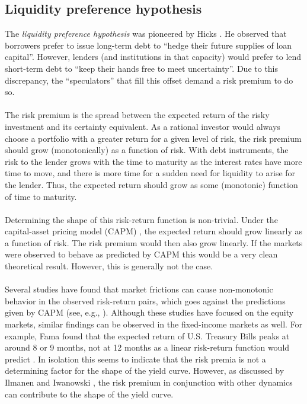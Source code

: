 \documentclass[a4paper]{artikel3}
\numberwithin{equation}{section}
\numberwithin{theorem}{section}
\numberwithin{proposition}{section}
\numberwithin{lemma}{section}
\begin{document}
\subsection{Liquidity preference hypothesis}
\label{sec:liquidity}


The \emph{liquidity preference hypothesis} was pioneered by Hicks \cite{hicks_1939}. He observed that borrowers prefer to issue long-term debt to ``hedge their future supplies of loan capital''. However, lenders (and institutions in that capacity) would prefer to lend short-term debt to ``keep their hands free to meet uncertainty''. Due to this discrepancy, the ``speculators'' that fill this offset demand a risk premium to do so. \\
\\
The risk premium is the spread between the expected return of the risky investment and its certainty equivalent. As a rational investor would always choose a portfolio with a greater return for a given level of risk, the risk premium should grow (monotonically) as a function of risk. With debt instruments, the risk to the lender grows with the time to maturity as the interest rates have more time to move, and there is more time for a sudden need for liquidity to arise for the lender. Thus, the expected return should grow as some (monotonic) function of time to maturity. \\
\\
Determining the shape of this risk-return function is non-trivial. Under the capital-asset pricing model (CAPM) \cite{sharpe_1964}, the expected return should grow linearly as a function of risk. The risk premium would then also grow linearly. If the markets were observed to behave as predicted by CAPM this would be a very clean theoretical result. However, this is generally not the case. \\
\\
Several studies have found that market frictions can cause non-monotonic behavior in the observed risk-return pairs, which goes against the predictions given by CAPM (see, e.g., \cite{baker_bradley_wurgler_2011, blitz_van_vliet_2007, frazzini_pedersen_2014}). Although these studies have focused on the equity markets, similar findings can be observed in the fixed-income markets as well. For example, Fama found that the expected return of U.S. Treasury Bills peaks at around 8 or 9 months, not at 12 months as a linear risk-return function would predict \cite{fama_1984b}. In isolation this seems to indicate that the risk premia is not a determining factor for the shape of the yield curve. However, as discussed by Ilmanen and Iwanowski \cite{ilmanen_iwanowski_1997}, the risk premium in conjunction with other dynamics can contribute to the shape of the yield curve. 
\end{document}
